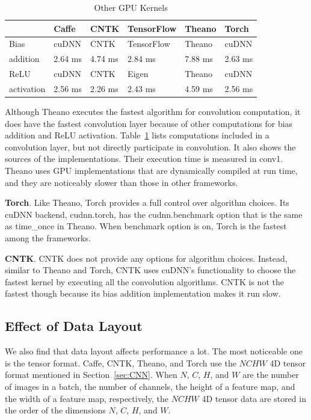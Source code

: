 \begin{table}[htbp]
\centering
\caption{Other GPU Kernels}
\label{table_misc_kernel}
\begin{scriptsize}
\begin{tabular}{|l|l|l|l|l|l|}
\hline\hline
           & Caffe    & CNTK    & TensorFlow & Theano  & Torch \\ \hline\hline
Bias       & cuDNN    & CNTK    & TensorFlow & Theano  & cuDNN \\ \cline{2-6} 
addition   & 2.64 ms  & 4.74 ms & 2.84 ms    & 7.88 ms & 2.63 ms  \\ \hline\hline
ReLU       & cuDNN    & CNTK    & Eigen      & Theano  & cuDNN \\ \cline{2-6}
activation & 2.56 ms  & 2.26 ms & 2.43 ms    & 4.59 ms & 2.56 ms  \\ \hline
\end{tabular}
\end{scriptsize}
\end{table}

Although Theano executes the fastest algorithm for convolution computation, it does have the fastest convolution layer because of other computations for bias addition and ReLU activation. Table~\ref{table_misc_kernel} lists computations included in a convolution layer, but not directly participate in convolution. It also shows the sources of the implementations. Their execution time is measured in \textsf{conv1}. Theano uses GPU implementations that are dynamically compiled at run time, and they are noticeably slower than those in other frameworks.

{\bf Torch}. Like Theano, Torch provides a full control over algorithm choices. Its cuDNN backend, cudnn.torch, has the \textsf{cudnn.benchmark} option that is the same as \textsf{time\_once} in Theano. When \textsf{benchmark} option is on, Torch is the fastest among the frameworks. 

{\bf CNTK}. CNTK does not provide any options for algorithm choices. Instead, similar to Theano and Torch, CNTK uses cuDNN's functionality to choose the fastest kernel by executing all the convolution algorithms. CNTK is not the fastest though because its bias addition implementation makes it run slow.

\subsection{Effect of Data Layout}
We also find that data layout affects performance a lot. The most noticeable one is the tensor format.
Caffe, CNTK, Theano, and Torch use the $NCHW$ 4D tensor format mentioned in Section~\ref{sec:CNN}. When $N$, $C$, $H$, and $W$ are the number of images in a batch, the number of channels, the height of a feature map, and the width of a feature map, respectively, the $NCHW$ 4D tensor data are stored in the order of the dimensions $N$, $C$, $H$, and $W$. 


